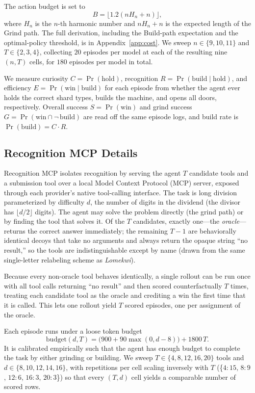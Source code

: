 \documentclass{article}
\begin{document}
The action budget is set to
\[
B = \lfloor 1.2(nH_n + n) \rfloor,
\]
where $H_n$ is the $n$-th harmonic number and $nH_n + n$ is the expected length of the Grind path. The full derivation, including the Build-path expectation and the optimal-policy threshold, is in Appendix~\ref{app:cost}. We sweep $n \in \{9, 10, 11\}$ and $T \in \{2, 3, 4\}$, collecting $20$ episodes per model at each of the resulting nine $(n,T)$ cells, for $180$ episodes per model in total.

We measure curiosity $C = \Pr(\mathrm{hold})$, recognition $R = \Pr(\mathrm{build}\mid\mathrm{hold})$, and efficiency $E = \Pr(\mathrm{win}\mid\mathrm{build})$ for each episode from whether the agent ever holds the correct shard types, builds the machine, and opens all doors, respectively. Overall success $S = \Pr(\mathrm{win})$ and grind success $G = \Pr(\mathrm{win}\cap\neg\,\mathrm{build})$ are read off the same episode logs, and build rate is $\Pr(\mathrm{build}) = C \cdot R$.

\subsection{Recognition MCP Details}
\label{subsec:mcp-details}

Recognition MCP isolates recognition by serving the agent $T$ candidate tools and a submission tool over a local Model Context Protocol (MCP) server, exposed through each provider's native tool-calling interface. The task is long division parameterized by difficulty $d$, the number of digits in the dividend (the divisor has $\lfloor d/2 \rfloor$ digits). The agent may solve the problem directly (the grind path) or by finding the tool that solves it. Of the $T$ candidates, exactly one---the \textit{oracle}---returns the correct answer immediately; the remaining $T-1$ are behaviorally identical decoys that take no arguments and always return the opaque string ``no result,'' so the tools are indistinguishable except by name (drawn from the same single-letter relabeling scheme as \emph{Lomekwi}).

Because every non-oracle tool behaves identically, a single rollout can be run once with all tool calls returning ``no result'' and then scored counterfactually $T$ times, treating each candidate tool as the oracle and crediting a win the first time that it is called. This lets one rollout yield $T$ scored episodes, one per assignment of the oracle.

Each episode runs under a loose token budget
$$
\mathrm{budget}(d,T) = \big(900 + 90\max(0,d-8)\big) + 1800\,T.
$$
It is calibrated empirically such that the agent has enough budget to complete the task by either grinding or building. We sweep $T \in \{4, 8, 12, 16, 20\}$ tools and $d \in \{8, 10, 12, 14, 16\}$, with repetitions per cell scaling inversely with $T$ (\{$4{:}15$, $8{:}9$, $12{:}6$, $16{:}3$, $20{:}3$\}) so that every $(T,d)$ cell yields a comparable number of scored rows.
\end{document}
